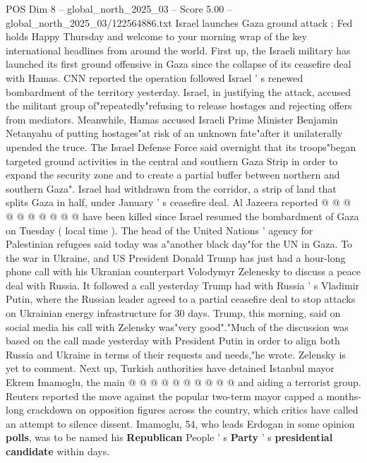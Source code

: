 \begin{textsample}{POS Dim 8 – global\_north\_2025\_03 – Score 5.00 – global\_north\_2025\_03/122564886.txt}  \label{ex:f8_pos_338}
Israel launches Gaza ground attack ; Fed holds Happy Thursday and welcome to your morning wrap of the key international headlines from around the world.
First up, the Israeli military has launched its first ground offensive in Gaza since the collapse of its ceasefire deal with Hamas.
CNN reported the operation followed Israel ' s renewed bombardment of the territory yesterday.
Israel, in justifying the attack, accused the militant group of"repeatedly"refusing to release hostages and rejecting offers from mediators.
Meanwhile, Hamas accused Israeli Prime Minister Benjamin Netanyahu of putting hostages"at risk of an unknown fate"after it unilaterally upended the truce.
The Israel Defense Force said overnight that its troops"began targeted ground activities in the central and southern Gaza Strip in order to expand the security zone and to create a partial buffer between northern and southern Gaza".
Israel had withdrawn from the corridor, a strip of land that splits Gaza in half, under January ' s ceasefire deal.
Al Jazeera reported @ @ @ @ @ @ @ @ @ @ have been killed since Israel resumed the bombardment of Gaza on Tuesday ( local time ).
The head of the United Nations ' agency for Palestinian refugees said today was a"another black day"for the UN in Gaza.
To the war in Ukraine, and US President Donald Trump has just had a hour-long phone call with his Ukranian counterpart Volodymyr Zelenesky to discuss a peace deal with Russia.
It followed a call yesterday Trump had with Russia ' s Vladimir Putin, where the Russian leader agreed to a partial ceasefire deal to stop attacks on Ukrainian energy infrastructure for 30 days.
Trump, this morning, said on social media his call with Zelensky was"very good"."Much of the discussion was based on the call made yesterday with President Putin in order to align both Russia and Ukraine in terms of their requests and needs,"he wrote.
Zelensky is yet to comment.
Next up, Turkish authorities have detained Istanbul mayor Ekrem Imamoglu, the main @ @ @ @ @ @ @ @ @ @ and aiding a terrorist group.
Reuters reported the move against the popular two-term mayor capped a months-long crackdown on opposition figures across the country, which critics have called an attempt to silence dissent.
Imamoglu, 54, who leads Erdogan in some opinion \textbf{polls}, was to be named his \textbf{Republican} People ' s \textbf{Party} ' s \textbf{presidential} \textbf{candidate} within days.

\end{textsample}
